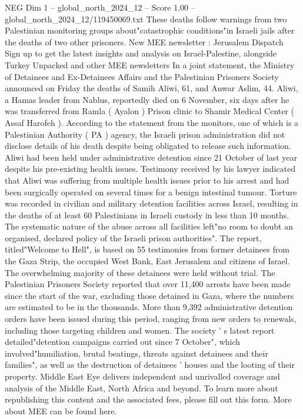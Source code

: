 \begin{textsample}{NEG Dim 1 – global\_north\_2024\_12 – Score 1.00 – global\_north\_2024\_12/119450069.txt}  \label{ex:f1_neg_193}
These deaths follow warnings from two Palestinian monitoring groups about"catastrophic conditions"in Israeli jails after the deaths of two other prisoners.
New MEE newsletter : Jerusalem Dispatch Sign up to get the latest insights and analysis on Israel-Palestine, alongside Turkey Unpacked and other MEE newsletters In a joint statement, the Ministry of Detainees and Ex-Detainees Affairs and the Palestinian Prisoners Society announced on Friday the deaths of Samih Aliwi, 61, and Anwar Aslim, 44.
Aliwi, a Hamas leader from Nablus, reportedly died on 6 November, six days after he was transferred from Ramla ( Ayalon ) Prison clinic to Shamir Medical Center ( Assaf Harofeh ).
According to the statement from the monitors, one of which is a Palestinian Authority ( PA ) agency, the Israeli prison administration did not disclose details of his death despite being obligated to release such information.
Aliwi had been held under administrative detention since 21 October of last year despite his pre-existing health issues.
Testimony received by his lawyer indicated that Aliwi was suffering from multiple health issues prior to his arrest and had been surgically operated on several times for a benign intestinal tumour.
Torture was recorded in civilian and military detention facilities across Israel, resulting in the deaths of at least 60 Palestinians in Israeli custody in less than 10 months.
The systematic nature of the abuse across all facilities left"no room to doubt an organised, declared policy of the Israeli prison authorities".
The report, titled"Welcome to Hell", is based on 55 testimonies from former detainees from the Gaza Strip, the occupied West Bank, East Jerusalem and citizens of Israel.
The overwhelming majority of these detainees were held without trial.
The Palestinian Prisoners Society reported that over 11,400 arrests have been made since the start of the war, excluding those detained in Gaza, where the numbers are estimated to be in the thousands.
More than 9,392 administrative detention orders have been issued during this period, ranging from new orders to renewals, including those targeting children and women.
The society ' s latest report detailed"detention campaigns carried out since 7 October", which involved"humiliation, brutal beatings, threats against detainees and their families", as well as the destruction of detainees ' houses and the looting of their property.
Middle East Eye delivers independent and unrivalled coverage and analysis of the Middle East, North Africa and beyond.
To learn more about republishing this content and the associated fees, please fill out this form.
More about MEE can be found here.

\end{textsample}
